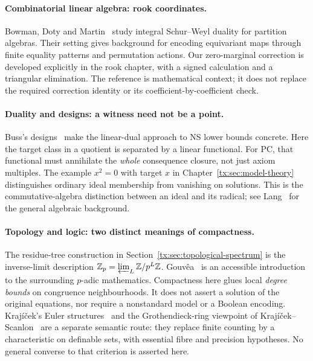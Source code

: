 \paragraph{Combinatorial linear algebra: rook coordinates.}
Bowman, Doty and Martin~\cite{BDM} study integral Schur--Weyl duality
for partition algebras. Their setting gives background for encoding
equivariant maps through finite equality patterns and permutation
actions. Our zero-marginal correction is developed explicitly in the
rook chapter, with a signed calculation and a triangular elimination.
The reference is mathematical context; it does not replace the
required correction identity or its coefficient-by-coefficient check.

\paragraph{Duality and designs: a witness need not be a point.}
Buss's designs~\cite{BussDesign} make the linear-dual approach to NS
lower bounds concrete. Here the target class in a quotient is separated
by a linear functional. For PC, that functional must annihilate the
\emph{whole} consequence closure, not just axiom multiples. The example
$x^2=0$ with target $x$ in Chapter~\ref{tx:sec:model-theory} distinguishes
ordinary ideal membership from vanishing on solutions. This is the
commutative-algebra distinction between an ideal and its radical;
see Lang~\cite{LangAlgebra} for the general algebraic background.

\paragraph{Topology and logic: two distinct meanings of compactness.}
The residue-tree construction in Section~\ref{tx:sec:topological-spectrum}
is the inverse-limit description
$\mathbb Z_p=\varprojlim_L\mathbb Z/p^L\mathbb Z$.
Gouv\^ea~\cite{Gouvea} is an accessible introduction to the surrounding
$p$-adic mathematics. Compactness here glues local \emph{degree bounds}
on congruence neighbourhoods. It does not assert a solution of the
original equations, nor require a nonstandard model or a Boolean
encoding. Kraj\'i\v cek's Euler structures~\cite{KrajEuler} and the
Grothendieck-ring viewpoint of Kraj\'i\v cek--Scanlon~\cite{KrajScanlon}
are a separate semantic route: they replace finite counting by a
characteristic on definable sets, with essential fibre and precision
hypotheses. No general converse to that criterion is asserted here.
